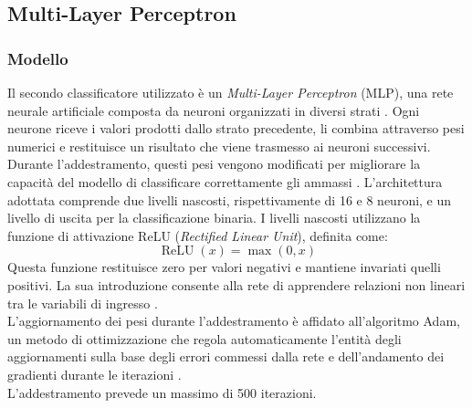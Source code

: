 \subsection{Multi-Layer Perceptron}
\label{subsec:mlp}
\subsubsection{Modello}
Il secondo classificatore utilizzato è un \emph{Multi-Layer Perceptron} (MLP), una rete neurale artificiale composta da neuroni organizzati in diversi strati \cite{goodfellow2016deeplearning}. Ogni neurone riceve i valori prodotti dallo strato precedente, li combina attraverso pesi numerici e restituisce un risultato che viene trasmesso ai neuroni successivi. Durante l'addestramento, questi pesi vengono modificati per migliorare la capacità del modello di classificare correttamente gli ammassi \cite{rumelhart1986learning}.
L'architettura adottata comprende due livelli nascosti, rispettivamente di 16 e 8 neuroni, e un livello di uscita per la classificazione binaria. I livelli nascosti utilizzano la funzione di attivazione ReLU (\emph{Rectified Linear Unit}), definita come:
\[
\operatorname{ReLU}(x)=\max(0,x)
\]
Questa funzione restituisce zero per valori negativi e mantiene invariati quelli positivi. La sua introduzione consente alla rete di apprendere relazioni non lineari tra le variabili di ingresso \cite{glorot2011rectifier}.\\
L'aggiornamento dei pesi durante l'addestramento è affidato all'algoritmo Adam, un metodo di ottimizzazione che regola automaticamente l'entità degli aggiornamenti sulla base degli errori commessi dalla rete e dell'andamento dei gradienti durante le iterazioni \cite{kingma2015adam}.\\ L'addestramento prevede un massimo di 500 iterazioni.
